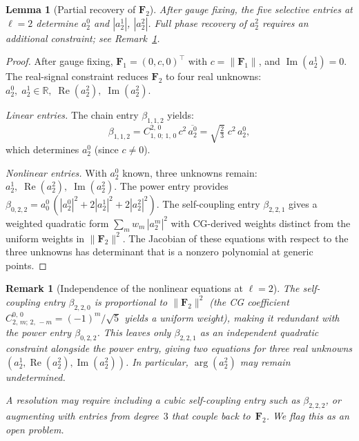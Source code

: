 \documentclass{article}
\newtheorem{lemma}[theorem]{Lemma}
\newtheorem{remark}[theorem]{Remark}
\newcommand{\R}{\mathbb{R}}
\newcommand{\CG}[6]{C^{#5,\,#6}_{#1,\,#2;\,#3,\,#4}}
\newcommand{\norm}[1]{\lVert #1 \rVert}
\newcommand{\conj}[1]{\overline{#1}}
\begin{document}
\begin{lemma}[Partial recovery of $\mathbf{F}_2$]\label{lem:app-F2}
After gauge fixing, the five selective entries at
$\ell = 2$ determine $a_2^0$ and $|a_2^1|$, $|a_2^2|$. Full phase
recovery of $a_2^2$ requires an additional constraint; see
Remark~\ref{rem:ell2-gap}.
\end{lemma}
\begin{proof}
After gauge fixing, $\mathbf{F}_1 = (0, c, 0)^\top$ with
$c = \norm{\mathbf{F}_1}$, and $\operatorname{Im}(a_2^1) = 0$. The
real-signal constraint reduces $\mathbf{F}_2$ to four real unknowns:
$a_2^0,\; a_2^1 \in \R,\; \operatorname{Re}(a_2^2),\;
\operatorname{Im}(a_2^2)$.

\medskip\noindent
\textit{Linear entries.}
The chain entry $\beta_{1,1,2}$ yields:
\begin{equation}\label{eq:app-beta112}
  \beta_{1,1,2}
  = \CG{1}{0}{1}{0}{2}{0}\,c^2\,\conj{a_2^0}
  = \sqrt{\tfrac{2}{3}}\;c^2\,a_2^0,
\end{equation}
which determines $a_2^0$ (since $c \ne 0$).

\medskip\noindent
\textit{Nonlinear entries.}
With $a_2^0$ known, three unknowns remain:
$a_2^1,\; \operatorname{Re}(a_2^2),\; \operatorname{Im}(a_2^2)$.
The power entry provides
$\beta_{0,2,2} = a_0^0\,(|a_2^0|^2 + 2|a_2^1|^2 + 2|a_2^2|^2)$.
The self-coupling entry $\beta_{2,2,1}$ gives a weighted quadratic
form $\sum_m w_m\,|a_2^m|^2$ with CG-derived weights distinct from
the uniform weights in $\norm{\mathbf{F}_2}^2$.
The Jacobian of these equations with respect to the three unknowns
has determinant that is a nonzero polynomial at generic points.
\end{proof}

\begin{remark}[Independence of the nonlinear equations at $\ell = 2$]
\label{rem:ell2-gap}
The self-coupling entry $\beta_{2,2,0}$ is proportional to
$\norm{\mathbf{F}_2}^2$ (the CG coefficient
$\CG{2}{m}{2}{-m}{0}{0} = (-1)^m/\sqrt{5}$ yields a uniform weight),
making it redundant with the power entry $\beta_{0,2,2}$. This leaves
only $\beta_{2,2,1}$ as an independent quadratic constraint alongside
the power entry, giving two equations for three real unknowns
$(a_2^1, \operatorname{Re}(a_2^2), \operatorname{Im}(a_2^2))$. In
particular, $\arg(a_2^2)$ may remain undetermined.

A resolution may require including a \emph{cubic} self-coupling entry
such as $\beta_{2,2,2}$, or augmenting with entries from degree~$3$
that couple back to~$\mathbf{F}_2$. We flag this as an open problem.
\end{remark}
\end{document}
